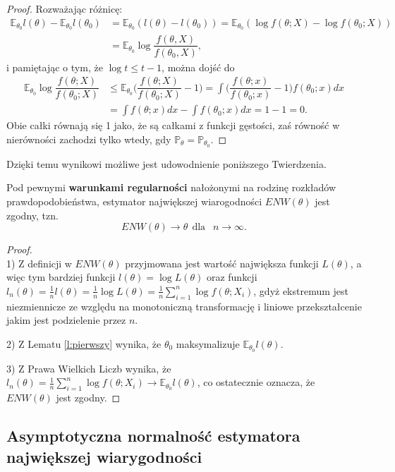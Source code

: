 \begin{proof}
Rozważając różnicę:
\begin{equation*}
\begin{split}
\mathbb{E}_{\theta_0}l(\theta) - \mathbb{E}_{\theta_0}l(\theta_0) & = \mathbb{E}_{\theta_0}(l(\theta) - l(\theta_0) ) = \mathbb{E}_{\theta_0}(\log f(\theta; X) - \log f(\theta_0; X)) \\
 & = \mathbb{E}_{\theta_0}\log\dfrac{f(\theta, X)}{f(\theta_0, X)},
\end{split}
\end{equation*}
i pamiętając o tym, że $\log t \leq t - 1$, można dojść do
\begin{equation*}
\begin{split}
\mathbb{E}_{\theta_0}\log\dfrac{f(\theta; X)}{f(\theta_0; X)} & \leq \mathbb{E}_{\theta_0}\Big(\dfrac{f(\theta; X)}{f(\theta_0; X)} - 1 \Big) = \int \Big(\dfrac{f(\theta; x)}{f(\theta_0; x)} - 1 \Big) f(\theta_0;x) dx \\ 
& = \int f(\theta;x)dx - \int f(\theta_0;x)dx = 1-1 =0.
\end{split}
\end{equation*}
Obie całki równają się 1 jako, że są całkami z funkcji gęstości, zaś równość w nierówności zachodzi tylko wtedy, gdy  $\mathbb{P}_{\theta}=\mathbb{P}_{\theta_0}$.
\end{proof}

Dzięki temu wynikowi możliwe jest udowodnienie poniższego Twierdzenia.

\begin{theorem}
Pod pewnymi \textbf{warunkami regularności} nałożonymi na rodzinę rozkładów prawdopodobieństwa, estymator największej wiarogodności $ENW(\theta)$ jest zgodny, tzn. 
$$ENW(\theta) \rightarrow \theta \ \ \text{dla } \ \ n \rightarrow \infty.$$
\end{theorem}
\begin{proof}
\ \\
1) Z definicji w $ENW(\theta)$ przyjmowana jest wartość największa funkcji $L(\theta)$, a więc tym bardziej funkcji $ l(\theta) = \log L(\theta)$ oraz funkcji $ l_n(\theta) = \frac{1}{n}l(\theta) = \frac{1}{n}\log L(\theta) = \frac{1}{n}\sum\limits_{i=1}^{n}\log f(\theta;X_i)$, gdyż ekstremum jest niezmiennicze ze względu na monotoniczną transformację i liniowe przekształcenie jakim jest podzielenie przez $n$.

2) Z Lematu \ref{l:pierwszy} wynika, że $\theta_0$ maksymalizuje $\mathbb{E}_{\theta_0}l(\theta)$.

3) Z Prawa Wielkich Liczb wynika, że $ l_n(\theta) = \frac{1}{n}\sum\limits_{i=1}^{n}\log f(\theta;X_i) \rightarrow \mathbb{E}_{\theta_0}l(\theta)$, co ostatecznie oznacza, że $ENW(\theta)$ jest zgodny.
\end{proof}

\newpage
\subsection{Asymptotyczna normalność estymatora największej wiarygodności}